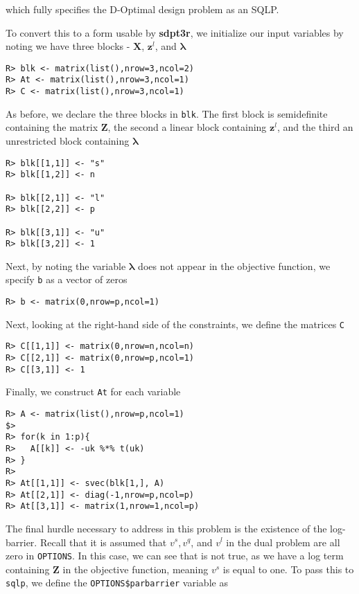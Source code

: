 \documentclass{article}
\newcommand{\ve}[1]{\mathbf{#1}}           %
\newcommand{\sv}[1]{\boldsymbol{#1}}   %
\newcommand{\m}[1]{\mathbf{#1}}               %
\begin{document}
\noindent which fully specifies the D-Optimal design problem as an SQLP. 

To convert this to a form usable by \textbf{sdpt3r}, we initialize our input variables by noting we have three blocks - $\m{X}$, $\ve{z}^{l}$, and $\sv{\lambda}$

\begin{verbatim}
R> blk <- matrix(list(),nrow=3,ncol=2)
R> At <- matrix(list(),nrow=3,ncol=1)
R> C <- matrix(list(),nrow=3,ncol=1)
\end{verbatim}

As before, we declare the three blocks in \verb!blk!. The first block is semidefinite containing the matrix $\m{Z}$, the second a linear block containing $\ve{z}^{l}$, and the third an unrestricted block containing $\sv{\lambda}$

\begin{verbatim}
R> blk[[1,1]] <- "s"
R> blk[[1,2]] <- n

R> blk[[2,1]] <- "l"
R> blk[[2,2]] <- p

R> blk[[3,1]] <- "u"
R> blk[[3,2]] <- 1
\end{verbatim}

Next, by noting the variable $\sv{\lambda}$ does not appear in the objective function, we specify \verb!b! as a vector of zeros

\begin{verbatim}
R> b <- matrix(0,nrow=p,ncol=1)
\end{verbatim}

Next, looking at the right-hand side of the constraints, we define the matrices \verb!C!

\begin{verbatim}
R> C[[1,1]] <- matrix(0,nrow=n,ncol=n)
R> C[[2,1]] <- matrix(0,nrow=p,ncol=1)
R> C[[3,1]] <- 1
\end{verbatim}

Finally, we construct \verb!At! for each variable

\begin{verbatim}
R> A <- matrix(list(),nrow=p,ncol=1)
$>
R> for(k in 1:p){
R>   A[[k]] <- -uk %*% t(uk)
R> }
R>
R> At[[1,1]] <- svec(blk[1,], A)
R> At[[2,1]] <- diag(-1,nrow=p,ncol=p)
R> At[[3,1]] <- matrix(1,nrow=1,ncol=p)
\end{verbatim}

The final hurdle necessary to address in this problem is the existence of the log-barrier. Recall that it is assumed that $v^{s}, v^{q}$, and $v^{l}$ in the dual problem are all zero in \verb!OPTIONS!. In this case, we can see that is not true, as we have a log term containing $\m{Z}$ in the objective function, meaning $v^{s}$ is equal to one. To pass this to \verb!sqlp!, we define the \verb!OPTIONS$parbarrier! variable as
\end{document}

